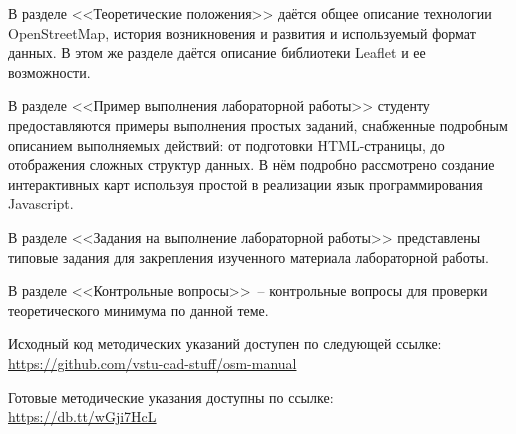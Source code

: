 \documentclass[a4paper, 14pt]{extreport}
\begin{document}
    В разделе <<Теоретические положения>> даётся общее описание технологии
    OpenStreetMap, история возникновения и развития и используемый формат
    данных. В этом же разделе даётся описание библиотеки Leaflet и ее
    возможности.

    В разделе <<Пример выполнения лабораторной работы>> студенту
    предоставляются примеры выполнения простых заданий, снабженные подробным
    описанием выполняемых действий: от подготовки HTML-страницы, до отображения
    сложных структур данных. В нём подробно рассмотрено создание интерактивных
    карт используя простой в реализации язык программирования Javascript.

    В разделе <<Задания на выполнение лабораторной работы>> представлены
    типовые задания для закрепления изученного материала лабораторной работы.

    В разделе <<Контрольные вопросы>>~-- контрольные вопросы для проверки
    теоретического минимума по данной теме.
    
    Исходный код методических указаний доступен по следующей ссылке:\\
    \url{https://github.com/vstu-cad-stuff/osm-manual}
    
    Готовые методические указания доступны по ссылке:\\
    \url{https://db.tt/wGji7HcL}
\end{document}

